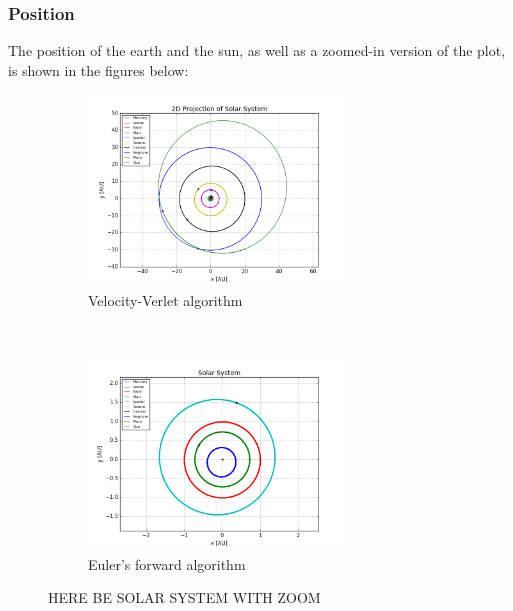 \documentclass[a4paper, 10pt]{article}
\begin{document}
\subsubsection{Position}
The position of the earth and the sun, as well as a zoomed-in version of the plot, is shown in the figures below:
\begin{figure}[t!]
    \centering
    \begin{subfigure}[t]{0.5\textwidth}
        \centering
        \includegraphics[height=2.0in]{orbitfull.png}
        \caption{Velocity-Verlet algorithm}
    \end{subfigure}%
    ~ 
    \begin{subfigure}[t]{0.5\textwidth}
        \centering
        \includegraphics[height=2.0in]{orbitFull.png}
        \caption{Euler's forward algorithm}
    \end{subfigure}
    \caption{HERE BE SOLAR SYSTEM WITH ZOOM}
\end{figure}
\end{document}
